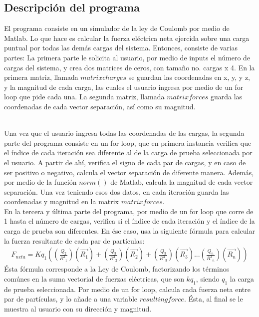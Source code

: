 \documentclass[12pt, letterpaper]{report}
\begin{document}
\subsection*{Descripción del programa}
El programa consiste en un simulador de la ley de Coulomb por medio de Matlab. Lo que hace es calcular 
la fuerza eléctrica neta ejercida sobre una carga puntual por todas las demás cargas del sistema. Entonces, consiste de varias partes: 
La primera parte le solicita al usuario, por medio de inputs el número de cargas del sistema, y crea dos matrices de ceros, con tamaño no. cargas x 4. En la primera 
matriz, llamada $matrix charges$ se guardan las coordenadas en x, y, y z, y la magnitud de cada carga, las cuales el usuario ingresa 
por medio de un for loop que pide cada una. La segunda matriz, llamada $matrix forces$ guarda las coordenadas de cada vector separación, así como su 
magnitud. \\ 

Una vez que el usuario ingresa todas las coordenadas de las cargas, la segunda parte del programa consiste en un for loop, que 
en primera instancia verifica que el índice de cada iteración sea diferente al de la carga de prueba seleccionada por el usuario. A partir de ahí, verifica 
el signo de cada par de cargas, y en caso de ser positivo o negativo, calcula el vector separación de diferente manera. Además, por medio de la función $norm()$ de Matlab, 
calcula la magnitud de cada vector separación. Una vez teniendo esos dos datos, en cada iteración guarda las coordenadas y magnitud en la matrix $matrix forces$. \\

En la tercera y última parte del programa, por medio de un for loop que corre de 1 hasta el número de cargas, verifica si el índice de cada iteración y el índice de la carga 
de prueba son diferentes. En ése caso, usa la siguiente fórmula para calcular la fuerza resultante de cada par de partículas: 
\begin{align}
F_{neta} = Kq_1((\frac{Q_2}{{R^3}_1})(\vec{R_1}) + (\frac{Q_3}{{R^3}_2})(\vec{R_2}) + (\frac{Q_3}{{R^3}_3})(\vec{R_3}) ... (\frac{Q_n}{{R^3}_n})(\vec{R_n}))
\end{align}
Ésta fórmula corresponde a la Ley de Coulomb, factorizando los términos comúnes en la suma vectorial de fuerzas eléctricas, que son $kq_1$, siendo $q_1$ la carga de prueba seleccionada. 
Por medio de un for loop, calcula cada fuerza neta entre par de partículas, y lo añade a una variable $resulting force$. Ésta, al final se le muestra al usuario con su dirección y magnitud. 
\end{document}
